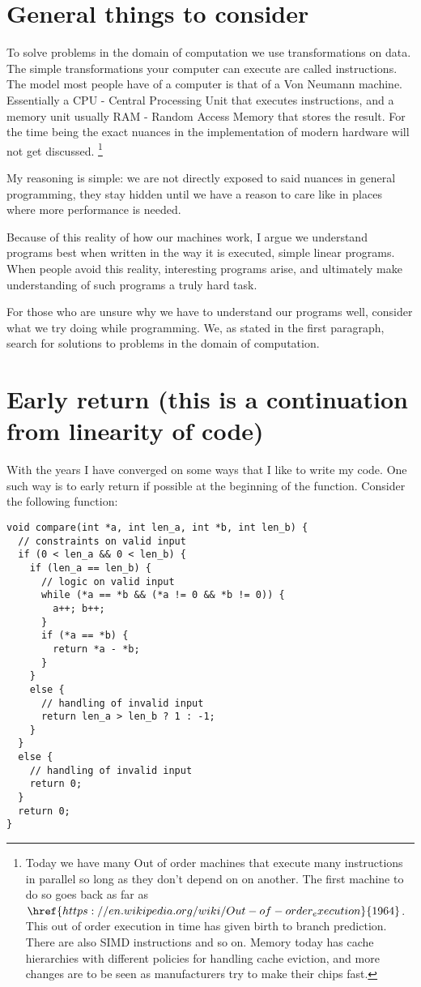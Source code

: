 \documentclass[a4paper]{article}
\begin{document}
\section{General things to consider}
To solve problems in the domain of computation we use transformations on data. The simple 
transformations your computer can execute are called instructions. The model most people 
have of a computer is that of a Von Neumann machine. Essentially a CPU - Central Processing 
Unit that executes instructions, and a memory unit usually RAM - Random Access Memory 
that stores the result. For the time being the exact nuances in the implementation of 
modern hardware will not get discussed. 
\footnote{Today we have many Out of order machines that execute many instructions in parallel so long as they don't depend on on another. The first machine to do so goes back as far as $\href{https://en.wikipedia.org/wiki/Out-of-order_execution}{1964}$. This out of order execution in time has given birth to branch prediction. There are also SIMD instructions and so on. Memory today has cache hierarchies with different policies for handling cache eviction, and more changes are to be seen as manufacturers try to make their chips fast.}  

My reasoning is simple: we are not directly exposed to said nuances in general programming, they stay hidden until we have a reason to care like in places where more performance is needed.

Because of this reality of how our machines work, I argue we understand programs best when written in the way it is executed, simple linear programs. When people avoid this reality, interesting programs arise, and ultimately make understanding of such programs a truly hard task.

For those who are unsure why we have to understand our programs well, consider what we try doing while programming. We, as stated in the first paragraph, search for solutions to problems in the domain of computation. 


\section{Early return (this is a continuation from linearity of code)}
With the years I have converged on some ways that I like to write my code. One such way is to early return if possible at the beginning of the function. Consider the following function:

\begin{lstlisting}
void compare(int *a, int len_a, int *b, int len_b) { 
  // constraints on valid input
  if (0 < len_a && 0 < len_b) {
    if (len_a == len_b) {
      // logic on valid input
      while (*a == *b && (*a != 0 && *b != 0)) { 
        a++; b++;
      }
      if (*a == *b) { 
        return *a - *b;
      }
    }
    else {
      // handling of invalid input
      return len_a > len_b ? 1 : -1; 
    }
  }
  else { 
    // handling of invalid input
    return 0; 
  }
  return 0;
}   
\end{lstlisting}
\end{document}
